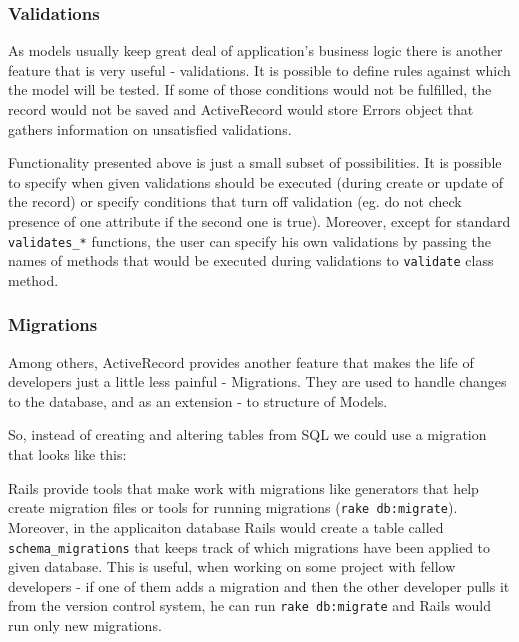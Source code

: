       

      \subsubsection{Validations}
      As models usually keep great deal of application's business logic there is another feature
      that is very useful - validations. It is possible to define rules against which the
      model will be tested. If some of those conditions would not be fulfilled, the record would
      not be saved and ActiveRecord would store Errors object that gathers information on
      unsatisfied validations.

      

      Functionality presented above is just a small subset of possibilities. It is possible
      to specify when given validations should be executed (during create or update of the record)
      or specify conditions that turn off validation (eg. do not check presence of one attribute
      if the second one is true). Moreover, except for standard \texttt{validates\_*} functions,
      the user can specify his own validations by passing the names of methods that would be
      executed during validations to \texttt{validate} class method.

      \subsubsection{Migrations}
      Among others, ActiveRecord provides another feature that makes the life of developers
      just a little less painful - Migrations. They are used to handle changes to the database,
      and as an extension - to structure of Models. 

      So, instead of creating and altering tables from SQL we could use a migration that looks
      like this:

      

      Rails provide tools that make work with migrations like generators that help create migration
      files or tools for running migrations (\texttt{rake db:migrate}). Moreover, in the applicaiton
      database Rails would create a table called \texttt{schema\_migrations} that keeps track of 
      which migrations have been applied to given database. This is useful, when working on some
      project with fellow developers - if one of them adds a migration and then the other developer
      pulls it from the version control system, he can run \texttt{rake db:migrate} and Rails
      would run only new migrations.

